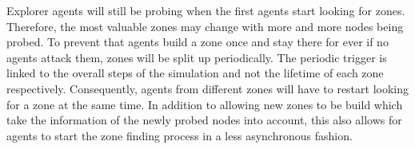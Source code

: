 Explorer agents will still be probing when the first agents start looking for zones. Therefore, the most valuable zones may change with more and more nodes being probed. To prevent that agents build a zone once and stay there for ever if no agents attack them, zones will be split up periodically. The periodic trigger is linked to the overall steps of the simulation and not the lifetime of each zone respectively. Consequently, agents from different zones will have to restart looking for a zone at the same time. In addition to allowing new zones to be build which take the information of the newly probed nodes into account, this also allows for agents to start the zone finding process in a less asynchronous fashion.
